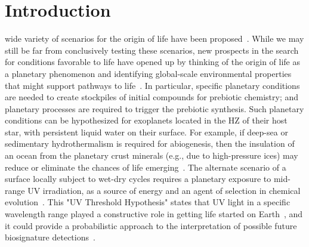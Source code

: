 \documentclass[twocolumn,twocolappendix,linenumbers]{aastex631}
\begin{document}
\section{Introduction}
\label{sec:intro}
 wide variety of scenarios for the origin of life have been proposed~\citep[e.g.,][]{Baross1985,Brasier2011,Mulkidjanian2012,Fox2013,Deamer2015,Westall2018}.
While we may still be far from conclusively testing these scenarios, new prospects in the search for conditions favorable to life have opened up by thinking of the origin of life as a planetary phenomenon and identifying global-scale environmental properties that might support pathways to life~\citep{Sasselov2020}.
In particular, specific planetary conditions are needed to create stockpiles of initial compounds for prebiotic chemistry; and planetary processes are required to trigger the prebiotic synthesis.
Such planetary conditions can be hypothesized for exoplanets located in the \gls{HZ} of their host star, with persistent liquid water on their surface.
For example, if deep-sea or sedimentary hydrothermalism is required for abiogenesis, then the insulation of an ocean from the planetary crust minerals (e.g., due to high-pressure ices) may reduce or eliminate the chances of life emerging~\citep[e.g.,][]{Baross1985}.
The alternate scenario of a surface locally subject to wet-dry cycles requires a planetary exposure to mid-range \gls{UV} irradiation, as a source of energy and an agent of selection in chemical evolution~\citep[e.g.,][]{Deamer2019}.
This "UV Threshold Hypothesis" states that \gls{UV} light in a specific wavelength range played a constructive role in getting life started on Earth~\citep{Ranjan2016,Ranjan2017c,Rimmer2018,Rapf2016}, and it could provide a probabilistic approach to the interpretation of possible future biosignature detections~\citep[e.g.,][]{Catling2018,Walker2018}.
\end{document}

